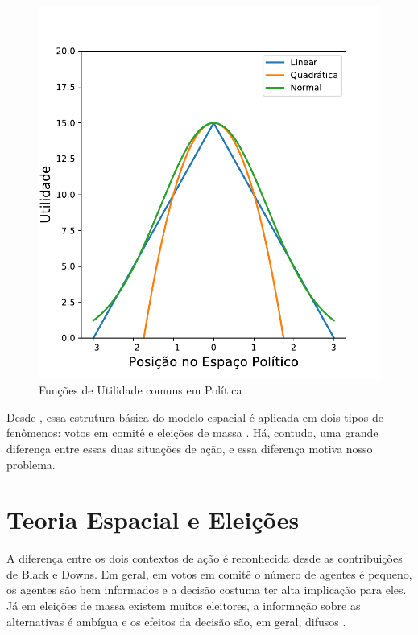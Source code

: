 \begin{figure}[H]
  \centering \includegraphics[scale = 0.6]{ims/utilities.pdf}
  \caption{Funções de Utilidade comuns em Política}
\end{figure}

Desde , essa estrutura básica do modelo espacial é
aplicada em dois tipos de fenômenos: votos em comitê e eleições de massa
\cite{munger2015choosing}. Há, contudo, uma grande diferença entre essas duas
situações de ação, e essa diferença motiva nosso problema.


\section{Teoria Espacial e Eleições}


A diferença entre os dois contextos de ação é reconhecida desde as contribuições
de Black e Downs. Em geral, em votos em comitê o número de agentes é pequeno, os
agentes são bem informados e a decisão costuma ter alta implicação para eles. Já
em eleições de massa existem muitos eleitores, a informação sobre as
alternativas é ambígua e os efeitos da decisão são, em geral, difusos
\cite{munger2015choosing}.

